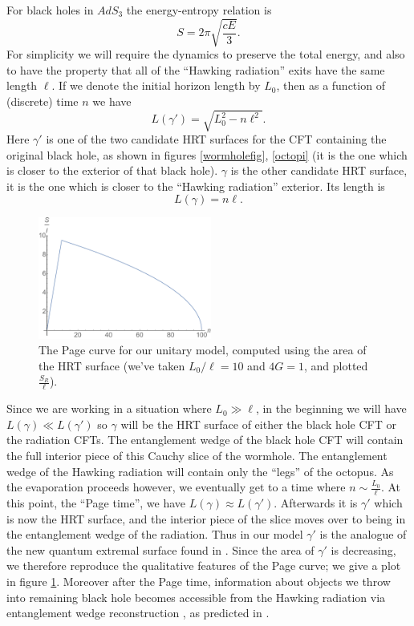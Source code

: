 \documentclass[12pt]{article}
\newcommand{\be}{\begin{equation}}
\newcommand{\ee}{\end{equation}}
\newcommand{\bfig}{\begin{figure}\begin{center}}
\newcommand{\efig}{\end{center}\end{figure}}
\theoremstyle{definition}
\begin{document}
For black holes in $AdS_3$ the energy-entropy relation is 
\be
S=2\pi \sqrt{\frac{cE}{3}}.
\ee
For simplicity we will require the dynamics to preserve the total energy, and also to have the property that all of the ``Hawking radiation'' exits have the same length $\ell$.  If we denote the initial horizon length by $L_0$, then as a function of (discrete) time $n$ we have
\be\label{Lgp}
L(\gamma')=\sqrt{L_0^2-n\ell^2}.
\ee
Here $\gamma'$ is one of the two candidate HRT surfaces for the CFT containing the original black hole, as shown in figures \ref{wormholefig}, \ref{octopi} (it is the one which is closer to the exterior of that black hole).  $\gamma$ is the other candidate HRT surface, it is the one which is closer to the ``Hawking radiation'' exterior.  Its length is
\be\label{Lg}
L(\gamma)=n\ell.
\ee

\bfig
\includegraphics[height=4cm]{page.pdf}
\caption{The Page curve for our unitary model, computed using the area of the HRT surface (we've taken $L_0/\ell=10$ and $4G=1$, and plotted $\frac{S_R}{\ell}$).}\label{pageplot}
\efig
Since we are working in a situation where $L_0\gg \ell$, in the beginning we will have $L(\gamma)\ll L(\gamma')$ so $\gamma$ will be the HRT surface of either the black hole CFT or the radiation CFTs.  The entanglement wedge of the black hole CFT will contain the full interior piece of this Cauchy slice of the wormhole.  The entanglement wedge of the Hawking radiation will contain only the ``legs'' of the octopus.  As the evaporation proceeds however, we  eventually get to a time where $n\sim \frac{L_0}{\ell}$.  At this point, the ``Page time'', we have $L(\gamma)\approx L(\gamma')$.  Afterwards it is $\gamma'$ which is now the HRT surface, and the interior piece of the slice moves over to being in the entanglement wedge of the radiation.  Thus in our model $\gamma'$ is the analogue of the new quantum extremal surface found in \cite{Almheiri:2019psf,Penington:2019npb,Almheiri:2019hni}.  Since the area of $\gamma'$ is decreasing, we therefore reproduce the qualitative features of the Page curve; we give a plot in figure \ref{pageplot}.   Moreover after the Page time, information about objects we throw into remaining black hole becomes accessible from the Hawking radiation via entanglement wedge reconstruction \cite{Czech:2012bh,Wall:2012uf,Headrick:2014cta,Jafferis:2015del,Dong:2016eik}, as predicted in \cite{Hayden:2007cs}.
\end{document}
